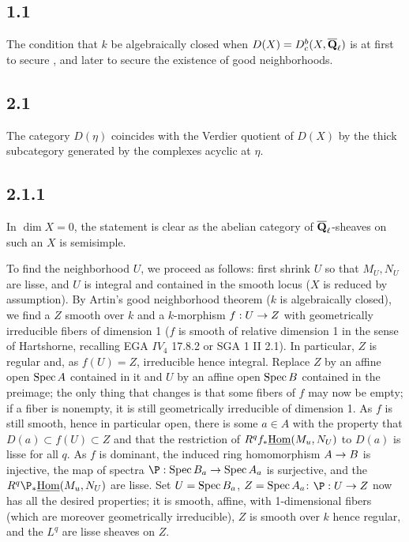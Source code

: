 \documentclass[deligne.tex]{subfiles}
\begin{document}
\subsection*{1.1}
The condition that $k$ be algebraically closed when
$D(X)=D_c^b(X,\overline{\mathbf{Q}}_\ell)$ is at first to secure \cite[2.2.14]{BBD},
and later to secure the existence of good neighborhoods.

\subsection*{2.1}
The category $D(\eta)$ coincides with the Verdier quotient of $D(X)$ by the
thick subcategory generated by the complexes acyclic at $\eta$.

\subsection*{2.1.1} In $\dim X=0$, the statement is clear as the abelian
category of $\overline{\mathbf{Q}}_\ell$-sheaves on such an $X$ is semisimple.

To find the neighborhood $U$, we proceed as follows: first shrink $U$ so that
$M_U,N_U$ are lisse, and $U$ is integral and contained in the smooth locus 
($X$ is reduced by assumption).
By Artin's good neighborhood theorem ($k$ is algebraically closed), we find a
$Z$ smooth over $k$ and a $k$-morphism $f:U\rightarrow Z$ with geometrically
irreducible fibers of dimension 1
($f$ is smooth of relative dimension 1 in the sense of Hartshorne, recalling
EGA $IV_4$ 17.8.2 or SGA 1 II 2.1).
In particular, $Z$ is regular and, as $f(U)=Z$, irreducible hence integral.
Replace $Z$ by an affine open $\operatorname{Spec} A$ contained in it and $U$ by an affine 
open $\operatorname{Spec} B$ contained in the preimage; the only thing that changes is that 
some fibers of $f$ may now be empty; if a fiber is nonempty, it is still 
geometrically irreducible of dimension 1.
As $f$ is still smooth, hence in particular open, there is some $a\in A$ with
the property that $D(a)\subset f(U)\subset Z$ and that the restriction of 
$R^qf_*\underline{\operatorname{Hom}}(M_u,N_U)$ to $D(a)$ is lisse for all $q$.
As $f$ is dominant, the induced ring homomorphism $A\rightarrow B$ is injective,
the map of spectra $\P:\Spec B_a\ra\Spec A_a$ is surjective, and the
$R^q\P_*\underline\Hom(M_u,N_U)$ are lisse. Set $U=\operatorname{Spec} B_a$, $Z=\operatorname{Spec} A_a$:
$\P:U\ra Z$ now has all the desired properties; it is smooth, affine, with
1-dimensional fibers (which are moreover geometrically irreducible), $Z$
is smooth over $k$ hence regular, and the $L^q$ are lisse sheaves on $Z$.
\end{document}
